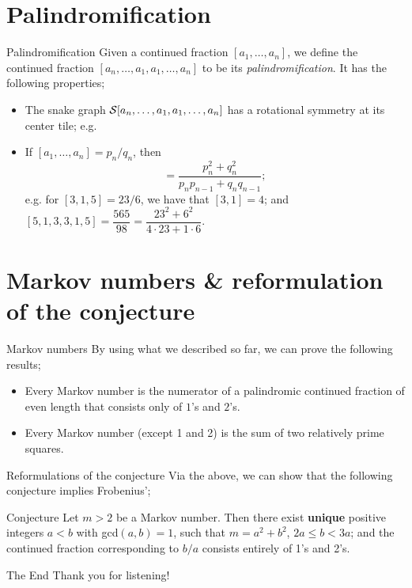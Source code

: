 \documentclass{beamer}
\def\s{\ensuremath\mathcal{S}}
\begin{document}
\section{Palindromification}

\begin{frame}{Palindromification}
    Given a continued fraction $[a_1,\dots,a_n]$, we define the continued fraction $[a_n,\dots,a_1,a_1,\dots,a_n]$ to be its \emph{palindromification}. It has the following properties; \pause
    \begin{itemize}
        \item The snake graph $\s[a_n,\dots,a_1,a_1,\dots,a_n]$ has a rotational symmetry at its center tile; \pause e.g.  \pause
        \item If $[a_1,\dots,a_n] = p_n/q_n$, then \pause
        \begin{equation*}
            [a_n,\dots,a_1,a_1,\dots,a_n] = \dfrac{p_n^2 + q_n^2}{p_np_{n-1} + q_nq_{n-1}}; 
        \end{equation*} \pause
        e.g. for $[3,1,5] = 23/6$, we have that $[3,1] = 4$; and $[5,1,3,3,1,5] = \dfrac{565}{98} = \dfrac{23^2 + 6^2}{4\cdot23 + 1 \cdot 6}$.
    \end{itemize}
\end{frame}

\section{Markov numbers \& reformulation of the conjecture}

\begin{frame}{Markov numbers}
By using what we described so far, we can prove the following results; \pause
\begin{itemize}
    \item Every Markov number is the numerator of a palindromic continued fraction of even length that consists only of $1$'s and $2$'s. \pause
    \item Every Markov number (except 1 and 2) is the sum of two relatively prime squares.
\end{itemize}
\end{frame}
\begin{frame}{Reformulations of the conjecture}
    Via the above, we can show that the following conjecture implies Frobenius'; \pause
    \begin{block}{Conjecture}
        Let $m > 2$ be a Markov number. Then there exist \textbf{unique} positive integers $a < b$ with gcd$(a,b) = 1$, such that $m = a^2 + b^2$, $2a \leq b < 3a$; and the continued fraction corresponding to $b/a$ consists entirely of 1's and 2's.
    \end{block}
\end{frame}

\begin{frame}{The End}
    Thank you for listening!

\end{frame}
\end{document}

